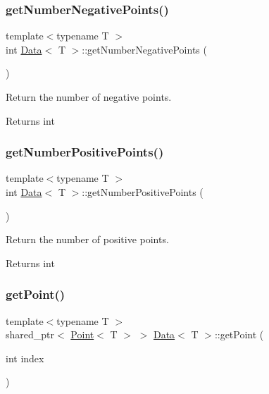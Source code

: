 \subsubsection{\texorpdfstring{get\+Number\+Negative\+Points()}{getNumberNegativePoints()}}
{\footnotesize\ttfamily template$<$typename T $>$ \\
int \hyperlink{class_data}{Data}$<$ T $>$\+::get\+Number\+Negative\+Points (\begin{DoxyParamCaption}{ }\end{DoxyParamCaption})}



Return the number of negative points. 

\begin{DoxyReturn}{Returns}
int 
\end{DoxyReturn}
\mbox{\label{class_data_a627911f72bc1ccc3a096b531772ccb8c}} 
\subsubsection{\texorpdfstring{get\+Number\+Positive\+Points()}{getNumberPositivePoints()}}
{\footnotesize\ttfamily template$<$typename T $>$ \\
int \hyperlink{class_data}{Data}$<$ T $>$\+::get\+Number\+Positive\+Points (\begin{DoxyParamCaption}{ }\end{DoxyParamCaption})}



Return the number of positive points. 

\begin{DoxyReturn}{Returns}
int 
\end{DoxyReturn}
\mbox{\label{class_data_a482efc1083d4871758ddd05b11bb90ea}} 
\subsubsection{\texorpdfstring{get\+Point()}{getPoint()}}
{\footnotesize\ttfamily template$<$typename T $>$ \\
shared\+\_\+ptr$<$ \hyperlink{class_point}{Point}$<$ T $>$ $>$ \hyperlink{class_data}{Data}$<$ T $>$\+::get\+Point (\begin{DoxyParamCaption}\item[{int}]{index }\end{DoxyParamCaption})}



